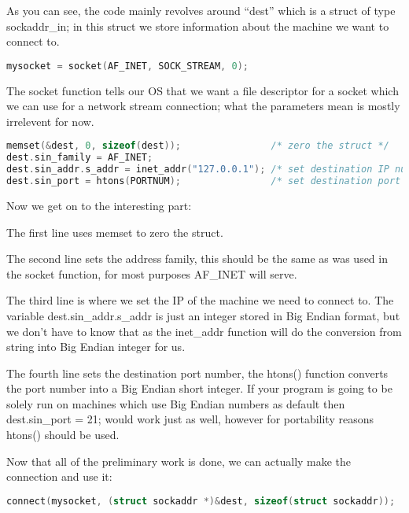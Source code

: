 As you can see, the code mainly revolves around ``dest'' which is a struct of
type sockaddr\_in; in this struct we store information about the machine we
want to connect to.
\lstset{basicstyle=\scriptsize, numbers=left, captionpos=b, tabsize=4}
\begin{lstlisting}[caption=Section \thesection listing \arabic{netcnt},language={C},
breaklines=true,xleftmargin=15pt,label=lst:section\thesection listing\arabic{netcnt}]
mysocket = socket(AF_INET, SOCK_STREAM, 0);
\end{lstlisting}

The socket function tells our OS that we want a file descriptor for a socket
which we can use for a network stream connection; what the parameters mean is
mostly irrelevent for now.
\lstset{basicstyle=\scriptsize, numbers=left, captionpos=b, tabsize=4}
\begin{lstlisting}[caption=Section \thesection listing \arabic{netcnt},language={C},
breaklines=true,xleftmargin=15pt,label=lst:section\thesection listing\arabic{netcnt}]
memset(&dest, 0, sizeof(dest));                /* zero the struct */
dest.sin_family = AF_INET;
dest.sin_addr.s_addr = inet_addr("127.0.0.1"); /* set destination IP number */ 
dest.sin_port = htons(PORTNUM);                /* set destination port number */
\end{lstlisting}

Now we get on to the interesting part:

The first line uses memset to zero the struct.

The second line sets the address family, this should be the same as was used in
the socket function, for most purposes AF\_INET will serve.

The third line is where we set the IP of the machine we need to connect to. The
variable dest.sin\_addr.s\_addr is just an integer stored in Big Endian format,
but we don't have to know that as the inet\_addr function will do the
conversion from string into Big Endian integer for us.

The fourth line sets the destination port number, the htons() function converts
the port number into a Big Endian short integer. If your program is going to be
solely run on machines which use Big Endian numbers as default then
dest.sin\_port = 21; would work just as well, however for portability reasons
htons() should be used.

Now that all of the preliminary work is done, we can actually make the
connection and use it:
\lstset{basicstyle=\scriptsize, numbers=left, captionpos=b, tabsize=4}
\begin{lstlisting}[caption=Section \thesection listing \arabic{netcnt},language={C},
breaklines=true,xleftmargin=15pt,label=lst:section\thesection listing\arabic{netcnt}]
connect(mysocket, (struct sockaddr *)&dest, sizeof(struct sockaddr));
\end{lstlisting}

